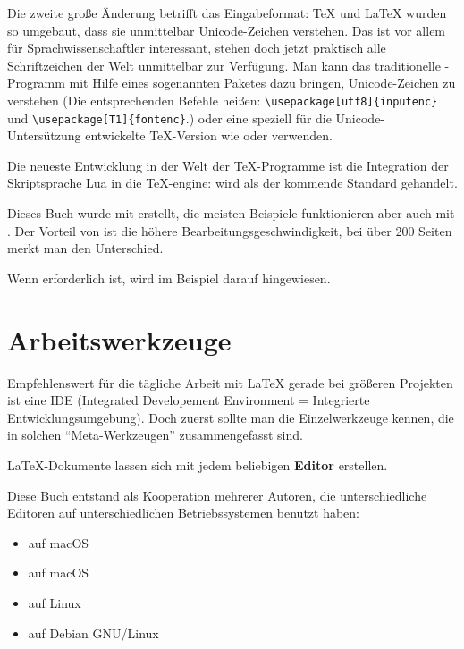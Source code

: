 Die zweite große Änderung betrifft das Eingabeformat:
\TeX{} und \LaTeX{} wurden so umgebaut, dass sie unmittelbar Unicode-Zeichen verstehen.
Das ist vor allem für Sprachwissenschaftler interessant, stehen doch jetzt praktisch alle Schriftzeichen
der Welt unmittelbar zur Verfügung. 
Man kann das traditionelle \pdfLaTeX-Programm mit Hilfe eines sogenannten Paketes dazu bringen, Unicode-Zeichen
zu verstehen
(Die entsprechenden Befehle heißen: \lstinline/\usepackage[utf8]{inputenc}/ 
und \lstinline/\usepackage[T1]{fontenc}/.)
oder eine speziell für die Unicode-Untersützung entwickelte \TeX{}-Version wie \XeLaTeX{} 
oder \LuaLaTeX{} verwenden.

Die neueste Entwicklung in der Welt der \TeX-Programme ist die Integration der Skriptsprache
Lua in die \TeX-engine: \LuaLaTeX{} wird als der kommende Standard gehandelt.

Dieses Buch wurde mit \LuaLaTeX{} erstellt, die meisten Beispiele funktionieren aber auch mit \pdfLaTeX{}.
Der Vorteil von \pdfLaTeX{} ist die höhere Bearbeitungsgeschwindigkeit, bei über 200 Seiten merkt man
den Unterschied.

Wenn \LuaLaTeX{} erforderlich ist, wird im Beispiel darauf hingewiesen.

\section{Arbeitswerkzeuge}

Empfehlenswert für die tägliche Arbeit mit \LaTeX{} gerade bei größeren Projekten ist eine 
IDE (Integrated Developement Environment = Integrierte Entwicklungsumgebung).
Doch zuerst sollte man die Einzelwerkzeuge kennen, die in solchen \enquote{Meta-Werkzeugen}
zusammengefasst sind.


\LaTeX{}-Dokumente lassen sich mit jedem beliebigen \textbf{Editor} erstellen.

Diese Buch entstand als Kooperation mehrerer Autoren, die unterschiedliche Editoren
auf unterschiedlichen Betriebssystemen benutzt haben:

\begin{itemize}
\item {} auf macOS
\item {} auf macOS
\item {} auf Linux
\item {} auf Debian GNU/Linux
\end{itemize}

